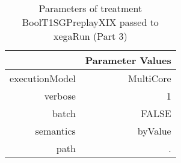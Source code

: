 \begin{table}[ht]
\centering
\begin{tabular}{rr}
  \hline
 & Parameter Values \\ 
  \hline
executionModel & MultiCore \\ 
  verbose & 1 \\ 
  batch & FALSE \\ 
  semantics & byValue \\ 
  path & . \\ 
   \hline
\end{tabular}
\caption{ Parameters of treatment BoolT1SGPreplayXIX passed to xegaRun
 (Part 3)} 
\end{table}
